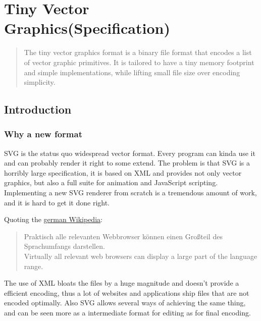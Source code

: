 \documentclass[]{article}
\begin{document}
\hypertarget{tiny-vector-graphics-specification}{%
\section{Tiny Vector Graphics(Specification)}\label{tiny-vector-graphics-specification}}

\begin{abstract}
The tiny vector graphics format is a binary file
format that encodes a list of vector graphic primitives. It is tailored
to have a tiny memory footprint and simple implementations, while
lifting small file size over encoding simplicity.
\end{abstract}


\hypertarget{introduction}{%
\subsection{Introduction}\label{introduction}}

\hypertarget{why-a-new-format}{%
\subsubsection{Why a new format}\label{why-a-new-format}}

SVG is the status quo widespread vector format. Every program can kinda
use it and can probably render it right to some extend. The problem is
that SVG is a horribly large specification, it is based on XML and
provides not only vector graphics, but also a full suite for animation
and JavaScript scripting. Implementing a new SVG renderer from scratch
is a tremendous amount of work, and it is hard to get it done right.

Quoting the \href{https://de.wikipedia.org/wiki/Scalable_Vector_Graphics}{german Wikipedia}:

\begin{quote}
Praktisch alle relevanten Webbrowser können einen Großteil des
Sprachumfangs darstellen.\\
Virtually all relevant web browsers can display a large part of the
language range.
\end{quote}

The use of XML bloats the files by a huge magnitude and doesn't provide
a efficient encoding, thus a lot of websites and applications ship files
that are not encoded optimally. Also SVG allows several ways of
achieving the same thing, and can be seen more as a intermediate format
for editing as for final encoding.
\end{document}
